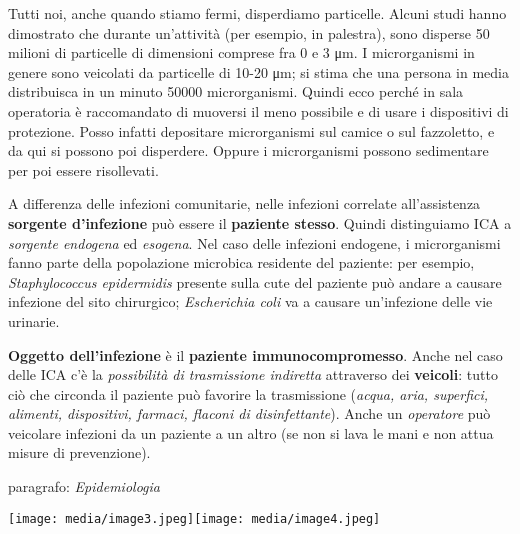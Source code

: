 \documentclass[]{article}
\begin{document}
Tutti noi, anche quando stiamo fermi, disperdiamo particelle. Alcuni
studi hanno dimostrato che durante un'attività (per esempio, in
palestra), sono disperse 50 milioni di particelle di dimensioni comprese
fra 0 e 3 μm. I microrganismi in genere sono veicolati da particelle di
10-20 μm; si stima che una persona in media distribuisca in un minuto
50000 microrganismi. Quindi ecco perché in sala operatoria è
raccomandato di muoversi il meno possibile e di usare i dispositivi di
protezione. Posso infatti depositare microrganismi sul camice o sul
fazzoletto, e da qui si possono poi disperdere. Oppure i microrganismi
possono sedimentare per poi essere risollevati.

A differenza delle infezioni comunitarie, nelle infezioni correlate
all'assistenza \textbf{sorgente d'infezione} può essere il
\textbf{paziente stesso}. Quindi distinguiamo ICA a \emph{sorgente
endogena} ed \emph{esogena}. Nel caso delle infezioni endogene, i
microrganismi fanno parte della popolazione microbica residente del
paziente: per esempio, \emph{Staphylococcus epidermidis} presente sulla
cute del paziente può andare a causare infezione del sito chirurgico;
\emph{Escherichia coli} va a causare un'infezione delle vie urinarie.

\textbf{Oggetto dell'infezione} è il \textbf{paziente
immunocompromesso}. Anche nel caso delle ICA c'è la \emph{possibilità di
trasmissione indiretta} attraverso dei \textbf{veicoli}: tutto ciò che
circonda il paziente può favorire la trasmissione (\emph{acqua, aria,
superfici, alimenti, dispositivi, farmaci, flaconi di disinfettante}).
Anche un \emph{operatore} può veicolare infezioni da un paziente a un
altro (se non si lava le mani e non attua misure di prevenzione).

paragrafo: \emph{Epidemiologia}

\texttt{[image: media/image3.jpeg]}\texttt{[image: media/image4.jpeg]}
\end{document}
